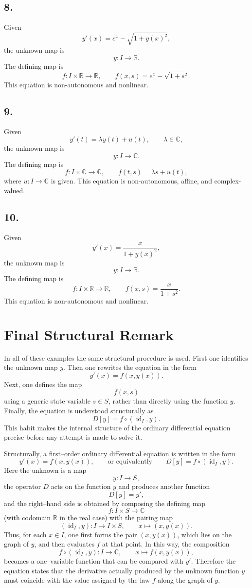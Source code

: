 \documentclass[12pt]{article}
\begin{document}
	\subsection*{8.}
	Given
	$$
	y'(x)=e^x-\sqrt{1+y(x)^2},
	$$
	the unknown map is
	$$
	y:I\to\mathbb{R}.
	$$
	The defining map is
	$$
	f:I\times\mathbb{R}\to\mathbb{R},
	\qquad
	f(x,s)=e^x-\sqrt{1+s^2}.
	$$
	This equation is non-autonomous and nonlinear.
	
	\subsection*{9.}
	Given
	$$
	y'(t)=\lambda y(t)+u(t),
	\qquad \lambda\in\mathbb{C},
	$$
	the unknown map is
	$$
	y:I\to\mathbb{C}.
	$$
	The defining map is
	$$
	f:I\times\mathbb{C}\to\mathbb{C},
	\qquad
	f(t,s)=\lambda s+u(t),
	$$
	where \(u:I\to\mathbb{C}\) is given. This equation is non-autonomous, affine, and complex-valued.
	
	\subsection*{10.}
	Given
	$$
	y'(x)=\frac{x}{1+y(x)^2},
	$$
	the unknown map is
	$$
	y:I\to\mathbb{R}.
	$$
	The defining map is
	$$
	f:I\times\mathbb{R}\to\mathbb{R},
	\qquad
	f(x,s)=\frac{x}{1+s^2}.
	$$
	This equation is non-autonomous and nonlinear.
	
	\section*{Final Structural Remark}
	
	In all of these examples the same structural procedure is used. First one identifies the unknown map \(y\). Then one rewrites the equation in the form
	$$
	y'(x)=f(x,y(x)).
	$$
	Next, one defines the map
	$$
	f(x,s)
	$$
	using a generic state variable \(s\in S\), rather than directly using the function \(y\). Finally, the equation is understood structurally as
	$$
	D[y]=f\circ(\operatorname{id}_I,y).
	$$
	This habit makes the internal structure of the ordinary differential equation precise before any attempt is made to solve it.
	
	Structurally, a first--order ordinary differential equation is written in the form
	$$
	y'(x)=f(x,y(x)),
	\qquad\text{or equivalently}\qquad
	D[y]=f\circ(\operatorname{id}_I,y).
	$$
	Here the unknown is a map
	$$
	y:I\to S,
	$$
	the operator \(D\) acts on the function \(y\) and produces another function
	$$
	D[y]=y',
	$$
	and the right--hand side is obtained by composing the defining map
	$$
	f:I\times S\to\mathbb{C}
	$$
	(with codomain \(\mathbb{R}\) in the real case) with the pairing map
	$$
	(\operatorname{id}_I,y):I\to I\times S,
	\qquad
	x\mapsto (x,y(x)).
	$$
	Thus, for each \(x\in I\), one first forms the pair \((x,y(x))\), which lies on the graph of \(y\), and then evaluates \(f\) at that point. In this way, the composition
	$$
	f\circ(\operatorname{id}_I,y):I\to\mathbb{C},
	\qquad
	x\mapsto f(x,y(x)),
	$$
	becomes a one--variable function that can be compared with \(y'\). Therefore the equation states that the derivative actually produced by the unknown function \(y\) must coincide with the value assigned by the law \(f\) along the graph of \(y\).
	
\end{document}
